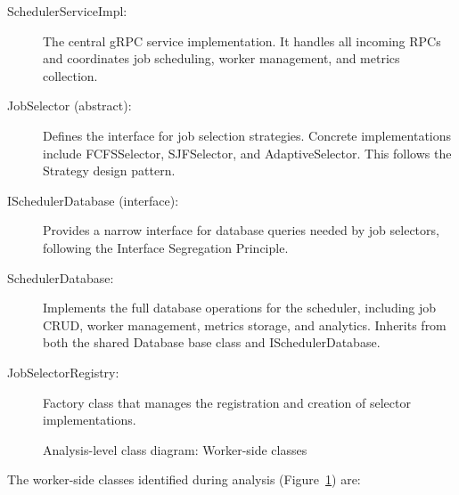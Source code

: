 \begin{description}
	\item[SchedulerServiceImpl:] The central gRPC service implementation. It handles all incoming RPCs and coordinates job scheduling, worker management, and metrics collection.

	\item[JobSelector (abstract):] Defines the interface for job selection strategies. Concrete implementations include FCFSSelector, SJFSelector, and AdaptiveSelector. This follows the Strategy design pattern.

	\item[ISchedulerDatabase (interface):] Provides a narrow interface for database queries needed by job selectors, following the Interface Segregation Principle.

	\item[SchedulerDatabase:] Implements the full database operations for the scheduler, including job CRUD, worker management, metrics storage, and analytics. Inherits from both the shared Database base class and ISchedulerDatabase.

	\item[JobSelectorRegistry:] Factory class that manages the registration and creation of selector implementations.
\end{description}

\begin{figure}[htbp]
	\centering
	\caption{Analysis-level class diagram: Worker-side classes}
	\label{fig:class-analysis-worker}
\end{figure}

The worker-side classes identified during analysis (Figure~\ref{fig:class-analysis-worker}) are:

